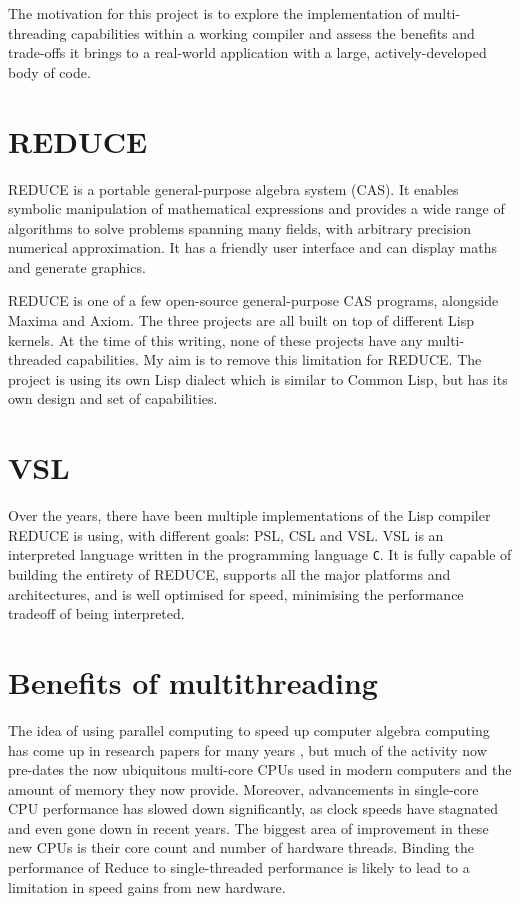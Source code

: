 The motivation for this project is to explore the implementation of multi-threading
capabilities within a working compiler and assess the benefits and trade-offs it brings
to a real-world application with a large, actively-developed body of code.

\section{REDUCE}

REDUCE \cite{reduce} is a portable general-purpose algebra system (CAS). It enables symbolic
manipulation of mathematical expressions and provides a wide range of algorithms
to solve problems spanning many fields, with arbitrary precision numerical approximation.
It has a friendly user interface and can display maths and generate graphics.

REDUCE is one of a few open-source general-purpose CAS programs, alongside Maxima and Axiom.
The three projects are all built on top of different Lisp kernels. At the time of this writing,
none of these projects have any multi-threaded capabilities. My aim is to remove this limitation
for REDUCE. The project is using its own Lisp dialect which is similar to Common Lisp, but has its
own design and set of capabilities.

\section{VSL}

Over the years, there have been multiple implementations of the Lisp compiler REDUCE is using, with
different goals: PSL, CSL and VSL. VSL is an interpreted language written in the programming
language \texttt{C}. It is fully capable of building the entirety of REDUCE, supports all the major
platforms and architectures, and is well optimised for speed, minimising the performance tradeoff
of being interpreted.

\section{Benefits of multithreading}

The idea of using parallel computing to speed up computer algebra computing has come
up in research papers for many years \cite{multithreading}, but much of the activity now
pre-dates the now ubiquitous multi-core CPUs used in modern computers and the amount of memory
they now provide. Moreover, advancements in single-core CPU performance has slowed down
significantly, as clock speeds have stagnated and even gone down in recent years. The biggest
area of improvement in these new CPUs is their core count and number of hardware threads.
Binding the performance of Reduce to single-threaded performance is likely to lead to
a limitation in speed gains from new hardware.

